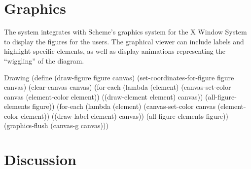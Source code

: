 \section{Graphics}

The system integrates with Scheme's graphics system for the X Window
System to display the figures for the users. The graphical viewer can
include labels and highlight specific elements, as well as display
animations representing the ``wiggling'' of the diagram.

\begin{code-listing}{Drawing}
(define (draw-figure figure canvas)
  (set-coordinates-for-figure figure canvas)
  (clear-canvas canvas)
  (for-each
   (lambda (element)
     (canvas-set-color canvas (element-color element))
     ((draw-element element) canvas))
   (all-figure-elements figure))
  (for-each
   (lambda (element)
     (canvas-set-color canvas (element-color element))
     ((draw-label element) canvas))
   (all-figure-elements figure))
  (graphics-flush (canvas-g canvas)))
\end{code-listing}

\section{Discussion}

\fi
